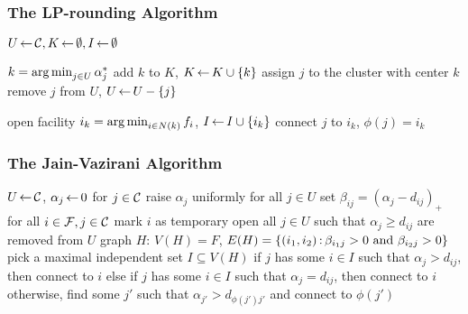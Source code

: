 \documentclass[handout, hyperref, xcolor=dvipsnames]{beamer}
\begin{document}
\begin{frame}
  \frametitle{The LP-rounding Algorithm}
    \begin{algorithm}[H]
      \begin{algorithmic}[1]
        \State $U {\,\leftarrow\,} {\cal C}, K {\,\leftarrow\,} \emptyset, I {\,\leftarrow\,} \emptyset$

        \State $k = \operatorname*{arg\,min}_{j\in U} \alpha_j^\ast$
        \State add $k$ to $K$, $K {\,\leftarrow\,} K \cup \{k\}$
        \State assign $j$ to the cluster with center $k$
        \State remove $j$ from $U$, $U {\,\leftarrow\,} U - \{j\}$
        \EndFor
        \EndWhile
        

         
        \State open facility $i_k = \operatorname*{arg\,min}_{i\in N(k)} f_i$, $I{\,\leftarrow\,} I \cup \{i_k\}$
        \State connect $j$ to $i_k$, $\phi(j) = i_k$
        \EndFor
        \EndFor
      \end{algorithmic}
    \end{algorithm}
\end{frame}

\begin{frame}
  \frametitle{The Jain-Vazirani Algorithm}
  \begin{algorithm}[H]
    \begin{algorithmic}[1]
      \State $U {\,\leftarrow\,} {\cal C}$, $\alpha_j {\,\leftarrow\,} 0$ for $j\in {\cal C}$
      \State raise $\alpha_j$ uniformly for all $j\in U$
      \State set $\beta_{ij} = (\alpha_j - d_{ij})_+$ for all $i\in {\cal F}, j \in {\cal C}$
      \State mark $i$ as temporary open
      \State all $j\in U$ such that $\alpha_j \geq d_{ij}$ are removed from $U$
      \EndIf
      \EndWhile
      \State graph $H$: $V(H)=F$, $E(H) = \{(i_1,i_2) {\,:\,} \beta_{i_1 j} > 0 \text{ and } \beta_{i_2 j} > 0\}$
      \State pick a maximal independent set $I\subseteq V(H)$
      \State if $j$ has some $i\in I$ such that $\alpha_j > d_{ij}$, then connect to $i$
      \State else if {$j$ has some $i\in I$ such that $\alpha_j = d_{ij}$}, then connect to $i$
      \State otherwise, find some $j'$ such that $\alpha_{j'} > d_{\phi(j')j'}$ and connect to $\phi(j')$
      \EndFor
    \end{algorithmic}
  \end{algorithm}
\end{frame}
\end{document}
